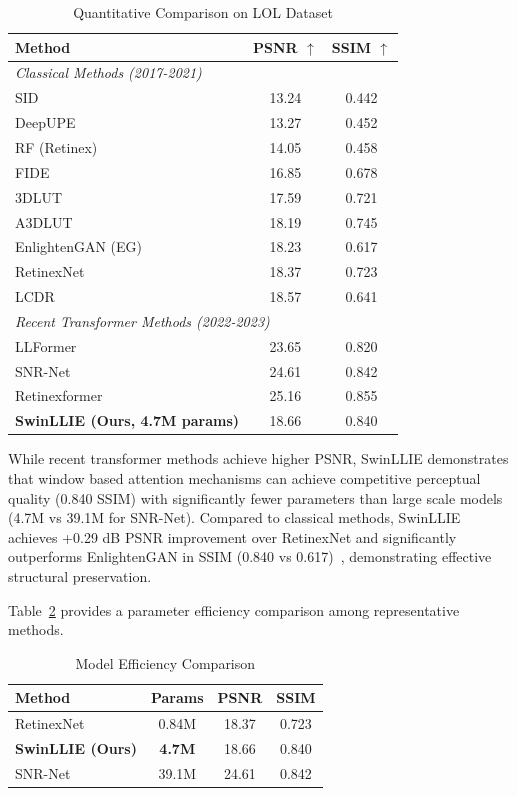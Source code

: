 \documentclass[conference]{IEEEtran}
\begin{document}
\begin{table}[htbp]
\caption{Quantitative Comparison on LOL Dataset}
\centering
\begin{tabular}{lcc}
\toprule
\textbf{Method} & \textbf{PSNR $\uparrow$} & \textbf{SSIM $\uparrow$} \\
\midrule
\multicolumn{3}{l}{\textit{Classical Methods (2017-2021)}} \\
SID & 13.24 & 0.442 \\
DeepUPE & 13.27 & 0.452 \\
RF (Retinex) & 14.05 & 0.458 \\
FIDE & 16.85 & 0.678 \\
3DLUT & 17.59 & 0.721 \\
A3DLUT & 18.19 & 0.745 \\
EnlightenGAN (EG) & 18.23 & 0.617 \\
RetinexNet & 18.37 & 0.723 \\
LCDR & 18.57 & 0.641 \\
\midrule
\multicolumn{3}{l}{\textit{Recent Transformer Methods (2022-2023)}} \\
LLFormer~\cite{wang2023llformer} & 23.65 & 0.820 \\
SNR-Net~\cite{xu2022snrnet} & 24.61 & 0.842 \\
Retinexformer~\cite{cai2023retinexformer} & 25.16 & 0.855 \\
\midrule
\textbf{SwinLLIE (Ours, 4.7M params)} & 18.66 & 0.840 \\
\bottomrule
\end{tabular}
\label{tab:results}
\end{table}

While recent transformer methods achieve higher PSNR, SwinLLIE demonstrates that window based attention mechanisms can achieve competitive perceptual quality (0.840 SSIM) with significantly fewer parameters than large scale models (4.7M vs 39.1M for SNR-Net). Compared to classical methods, SwinLLIE achieves +0.29 dB PSNR improvement over RetinexNet and significantly outperforms EnlightenGAN in SSIM (0.840 vs 0.617)~\cite{wang2004ssim}, demonstrating effective structural preservation.

Table~\ref{tab:efficiency} provides a parameter efficiency comparison among representative methods.

\begin{table}[htbp]
\caption{Model Efficiency Comparison}
\centering
\begin{tabular}{lccc}
\toprule
\textbf{Method} & \textbf{Params} & \textbf{PSNR} & \textbf{SSIM} \\
\midrule
RetinexNet & 0.84M & 18.37 & 0.723 \\
\textbf{SwinLLIE (Ours)} & \textbf{4.7M} & 18.66 & 0.840 \\
SNR-Net & 39.1M & 24.61 & 0.842 \\
\bottomrule
\end{tabular}
\label{tab:efficiency}
\end{table}
\end{document}
